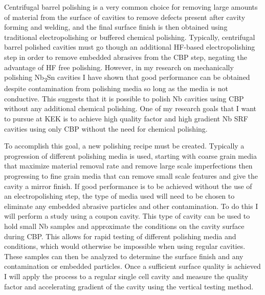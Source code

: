 Centrifugal barrel polishing is a very common choice for removing large amounts of material from the surface of cavities to remove defects present after cavity forming and welding, and the final surface finish is then obtained using traditional electropolishing or buffered chemical polishing. Typically, centrifugal barrel polished cavities must go though an additional HF-based electropolishing step in order to remove embedded abrasives from the CBP step, negating the advantage of HF free polishing. However, in my research on mechanically polishing Nb\textsubscript{3}Sn cavities I have shown that good performance can be obtained despite contamination from polishing media so long as the media is not conductive. This suggests that it is possible to polish Nb cavities using CBP without any additional chemical polishing. One of my research goals that I want to pursue at KEK is to achieve high quality factor and high gradient Nb SRF cavities using only CBP without the need for chemical polishing. 
    
To accomplish this goal, a new polishing recipe must be created. Typically a progression of different polishing media is used, starting with coarse grain media that maximize material removal rate and remove large scale imperfections then progressing to fine grain media that can remove small scale features and give the cavity a mirror finish. If good performance is to be achieved without the use of an electropolishing step, the type of media used will need to be chosen to eliminate any embedded abrasive particles and other contamination. To do this I will perform a study using a coupon cavity. This type of cavity can be used to hold small Nb samples and approximate the conditions on the cavity surface during CBP. This allows for rapid testing of different polishing media and conditions, which would otherwise be impossible when using regular cavities. These samples can then be analyzed to determine the surface finish and any contamination or embedded particles. Once a sufficient surface quality is achieved I will apply the process to a regular single cell cavity and measure the quality factor and accelerating gradient of the cavity using the vertical testing method.